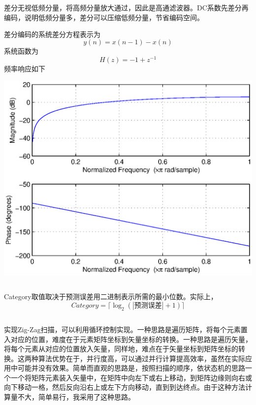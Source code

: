 \documentclass{article}
\begin{document}
\subsection{}
\noindent{}
\par 
差分无视低频分量，将高频分量放大通过，因此是高通滤波器。DC系数先差分再编码，说明低频分量多，差分可以压缩低频分量，节省编码空间。\par
差分编码的系统差分方程表示为$$y(n)=x(n-1)-x(n)$$系统函数为$$H(z)=-1+z^{-1}$$频率响应如下\par\begin{center}\includegraphics[width=\textwidth]{A3_2_5.eps}\end{center}

\subsection{}
\noindent{}
\par Category取值取决于预测误差用二进制表示所需的最小位数。实际上，$$Category=\lceil\log_2(|\mbox{预测误差}|+1)\rceil$$

\subsection{}
\noindent{}
\par 实现Zig-Zag扫描，可以利用循环控制实现。一种思路是遍历矩阵，将每个元素置入对应的位置，难度在于元素矩阵坐标到矢量坐标的转换。一种思路是遍历矢量，将每个元素从对应的位置放入矢量，同样地，难点在于矢量坐标到矩阵坐标的转换。这两种算法优势在于，并行度高，可以通过并行计算提高效率，虽然在实际应用中可能并没有效果。简单而直观的思路是，按照扫描的顺序，依状态机的思路一个一个将矩阵元素装入矢量中，在矩阵中向左下或右上移动，到矩阵边缘则向右或向下移动一格，然后反向沿右上或左下方向移动，直到到达终点。由于这种方法计算量不大，简单易行，我采用了这种思路。
\end{document}
